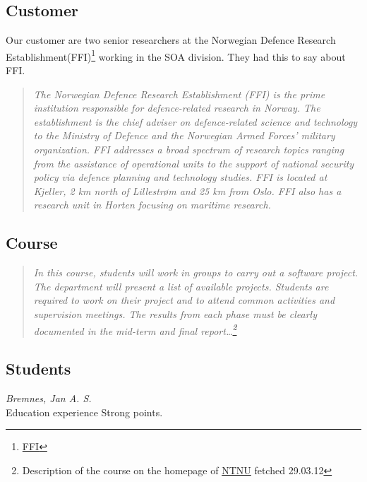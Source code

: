     \subsection{Customer}\label{Customer}
    Our customer are two senior researchers at the Norwegian Defence Research Establishment(FFI)\footnote{\href{http://www.ffi.no/no/Sider/default.aspx}{FFI}} working in the SOA division. They had this to say about FFI.
    \begin{quotation}
    \em The Norwegian Defence Research Establishment (FFI) is the prime institution responsible for defence-related research in Norway. The establishment is the chief adviser on defence-related science and technology to the Ministry of Defence and the Norwegian Armed Forces’ military organization. FFI addresses a broad spectrum of research topics ranging from the assistance of operational units to the support of national security policy via defence planning and technology studies. FFI is located at Kjeller, 2 km north of Lillestrøm and 25 km from Oslo. FFI also has a research unit in Horten focusing on maritime research.
    \end{quotation}
    
    \subsection{Course}\label{Course}
    \begin{quotation}
    \em In this course, students will work in groups to carry out a software project. The department will present a list of available projects. Students are required to work on their project and to attend common activities and supervision meetings. The results from each phase must be clearly documented in the mid-term and final report\ldots\footnote{Description of the course on the homepage of \href{http://www.ntnu.edu/studies/courses/IT2901}{NTNU} fetched 29.03.12}
    \end{quotation}
    
    \subsection{Students}\label{Students}
    
    \begin{Student}
    \indent \indent \textit{Bremnes, Jan A. S. } \\
        Education
        experience
        Strong points. 
        \\
    \end{Student}
    
